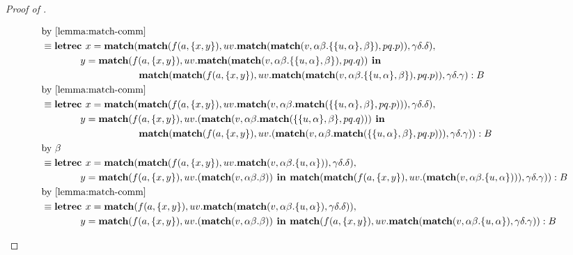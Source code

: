 \begin{proof}[Proof of ]
\begin{itemize}
\begin{align*}
&\text{by \cref{lemma:match-comm}}\\
&\equiv \textbf{letrec } x = \textbf{match}(\textbf{match}(f(a,\{x,y\}), uv.\textbf{match}(\textbf{match}(v, \alpha\beta.\{\{u,\alpha\},\beta\}), pq.p)), \gamma\delta.\delta),\\
&\hspace{4em} y = \textbf{match}(f(a,\{x,y\}), uv.\textbf{match}(\textbf{match}(v, \alpha\beta.\{\{u,\alpha\},\beta\}), pq.q)) \textbf{ in }\\
&\hspace{10em} \textbf{match}(\textbf{match}(f(a,\{x,y\}), uv.\textbf{match}(\textbf{match}(v, \alpha\beta.\{\{u,\alpha\},\beta\}), pq.p)), \gamma\delta.\gamma) : B\\
&\text{by \cref{lemma:match-comm}}\\
&\equiv \textbf{letrec } x = \textbf{match}(\textbf{match}(f(a,\{x,y\}), uv.\textbf{match}(v, \alpha\beta.\textbf{match}(\{\{u,\alpha\},\beta\}, pq.p))), \gamma\delta.\delta),\\
&\hspace{4em} y = \textbf{match}(f(a,\{x,y\}), uv.(\textbf{match}(v, \alpha\beta.\textbf{match}(\{\{u,\alpha\},\beta\}, pq.q))) \textbf{ in }\\
&\hspace{10em} \textbf{match}(\textbf{match}(f(a,\{x,y\}), uv.(\textbf{match}(v, \alpha\beta.\textbf{match}(\{\{u,\alpha\},\beta\}, pq.p))), \gamma\delta.\gamma)) : B\\
&\text{by $\beta$}\\
&\equiv \textbf{letrec } x = \textbf{match}(\textbf{match}(f(a,\{x,y\}), uv.\textbf{match}(v, \alpha\beta.\{u,\alpha\})), \gamma\delta.\delta),\\
&\hspace{4em} y = \textbf{match}(f(a,\{x,y\}), uv.(\textbf{match}(v, \alpha\beta.\beta)) \textbf{ in } \textbf{match}(\textbf{match}(f(a,\{x,y\}), uv.(\textbf{match}(v, \alpha\beta.\{u,\alpha\}))), \gamma\delta.\gamma)) : B\\
&\text{by \cref{lemma:match-comm}}\\
&\equiv \textbf{letrec } x = \textbf{match}(f(a,\{x,y\}), uv.\textbf{match}(\textbf{match}(v, \alpha\beta.\{u,\alpha\}), \gamma\delta.\delta)),\\
&\hspace{4em} y = \textbf{match}(f(a,\{x,y\}), uv.(\textbf{match}(v, \alpha\beta.\beta)) \textbf{ in } \textbf{match}(f(a,\{x,y\}), uv.\textbf{match}(\textbf{match}(v, \alpha\beta.\{u,\alpha\}), \gamma\delta.\gamma)) : B\\

\end{align*}
\end{itemize}
\end{proof}
